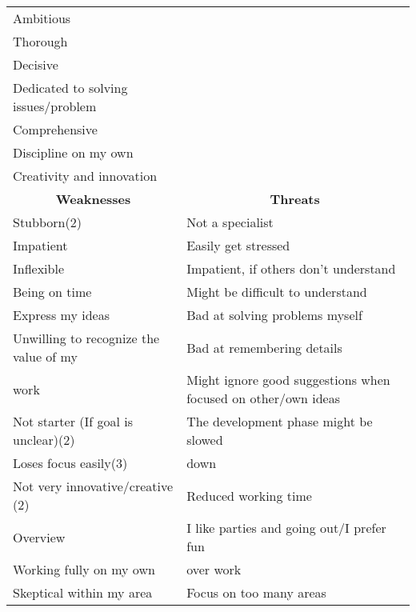 \begin{table}[!ht]
\begin{tabular}{|p{}|p{}|}
Ambitious                               &\\
Thorough                                &\\
Decisive                                &\\
Dedicated to solving issues/problem     &\\
Comprehensive                           &\\
Discipline on my own                    &\\ %
Creativity and innovation               &\\
 \hline
\multicolumn{1}{|c|}{\textbf {Weaknesses}}                                                  & \multicolumn{1}{c|}{\textbf{Threats}}                          \\ \hline
Stubborn(2)                             & Not a specialist\\
Impatient                               & Easily get stressed\\
Inflexible                              & Impatient, if others don't understand\\ %
Being on time                           & Might be difficult to understand\\
Express my ideas                        & Bad at solving problems myself\\
Unwilling to recognize the value of my  & Bad at remembering details\\ %
work                                    & Might ignore good suggestions when focused on other/own ideas\\
Not starter (If goal is unclear)(2)     & The development phase might be slowed \\
Loses focus easily(3)                   & down\\ %
Not very innovative/creative (2)        & Reduced working time \\
Overview                                & I like parties and going out/I prefer fun \\
Working fully on my own                 & over work\\ %
Skeptical within my area                & Focus on too many areas\\

\end{tabular}
\end{table}

